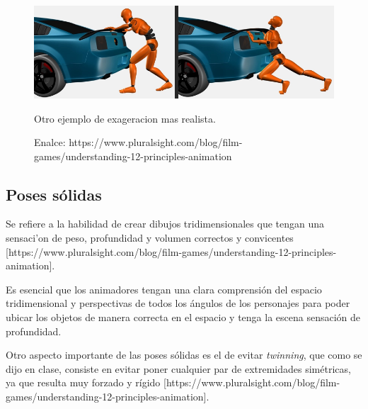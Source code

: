 \documentclass{article}
\begin{document}
\begin{figure}[H]
    \centering
    \includegraphics[width=\textwidth]{imagenes/Exaggeration.png}
    \caption{Otro ejemplo de exageracion mas realista.}
    \caption{Enalce: https://www.pluralsight.com/blog/film-games/understanding-12-principles-animation}
\end{figure}

\subsection{Poses sólidas}

Se refiere a la habilidad de crear dibujos tridimensionales que tengan una sensaci'on de peso, profundidad y volumen correctos y convicentes [https://www.pluralsight.com/blog/film-games/understanding-12-principles-animation].

\bigskip

Es esencial que los animadores tengan una clara comprensión del espacio tridimensional y perspectivas de todos los ángulos de los personajes para poder ubicar los objetos de manera correcta en el espacio y tenga la escena sensación de profundidad.

\bigskip

Otro aspecto importante de las poses sólidas es el de evitar \textit{twinning}, que como se dijo en clase, consiste en evitar poner cualquier par de extremidades simétricas, ya que resulta muy forzado y rígido [https://www.pluralsight.com/blog/film-games/understanding-12-principles-animation].
\end{document}
